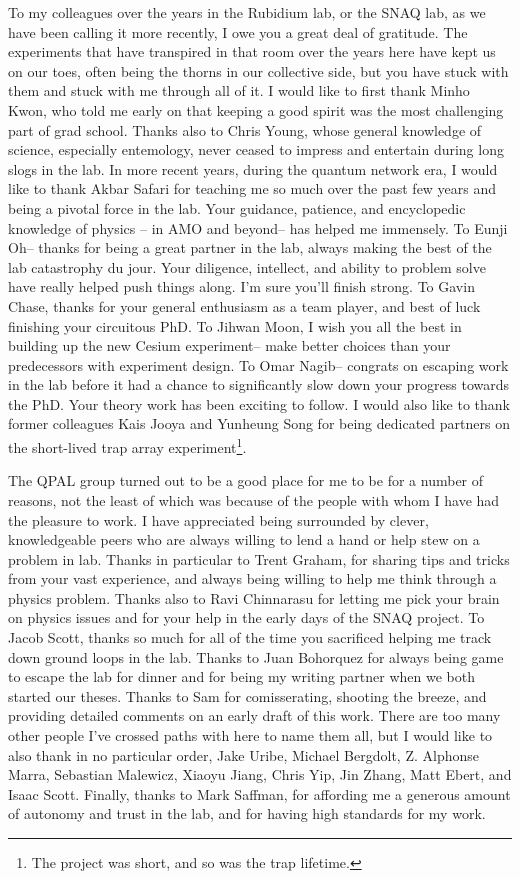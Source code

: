 To my colleagues over the years in the Rubidium lab, or the SNAQ lab, as we have been calling it more recently, I owe you a great deal of gratitude. The experiments that have transpired in that room over the years here have kept us on our toes, often being the thorns in our collective side, but you have stuck with them and stuck with me through all of it. I would like to first thank Minho Kwon, who told me early on that keeping a good spirit was the most challenging part of grad school. Thanks also to Chris Young, whose general knowledge of science, especially entemology, never ceased to impress and entertain during long slogs in the lab. In more recent years, during the quantum network era, I would like to thank Akbar Safari for teaching me so much over the past few years and being a pivotal force in the lab. Your guidance, patience, and encyclopedic knowledge of physics -- in AMO and beyond-- has helped me immensely. To Eunji Oh-- thanks for being a great partner in the lab, always making the best of the lab catastrophy du jour. Your diligence, intellect, and ability to problem solve have really helped push things along. I'm sure you'll finish strong. To Gavin Chase, thanks for your general enthusiasm as a team player, and best of luck finishing your circuitous PhD. To Jihwan Moon, I wish you all the best in building up the new Cesium experiment-- make better choices than your predecessors with experiment design. To Omar Nagib-- congrats on escaping work in the lab before it had a chance to significantly slow down your progress towards the PhD. Your theory work has been exciting to follow. I would also like to thank former colleagues Kais Jooya and Yunheung Song for being dedicated partners on the short-lived trap array experiment\footnote{The project was short, and so was the trap lifetime.}.

The QPAL group turned out to be a good place for me to be for a number of reasons, not the least of which was because of the people with whom I have had the pleasure to work. I have appreciated being surrounded by clever, knowledgeable peers who are always willing to lend a hand or help stew on a problem in lab. Thanks in particular to Trent Graham, for sharing tips and tricks from your vast experience, and always being willing to help me think through a physics problem. Thanks also to Ravi Chinnarasu for letting me pick your brain on physics issues and for your help in the early days of the SNAQ project. To Jacob Scott, thanks so much for all of the time you sacrificed helping me track down ground loops in the lab. Thanks to Juan Bohorquez for always being game to escape the lab for dinner and for being my writing partner when we both started our theses. Thanks to Sam for comisserating, shooting the breeze, and providing detailed comments on an early draft of this work. There are too many other people I've crossed paths with here to name them all, but I would like to also thank in no particular order, Jake Uribe, Michael Bergdolt, Z. Alphonse Marra, Sebastian Malewicz, Xiaoyu Jiang, Chris Yip, Jin Zhang, Matt Ebert, and Isaac Scott. Finally, thanks to Mark Saffman, for affording me a generous amount of autonomy and trust in the lab, and for having high standards for my work.

